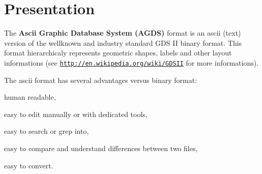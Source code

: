 \hypertarget{agds_agdsPres}{}\section{Presentation}\label{agds_agdsPres}
The {\bfseries Ascii Graphic Database System (A\-G\-D\-S)} format is an ascii (text) version of the wellknown and industry standard G\-D\-S I\-I binary format. This format hierarchicaly represents geometric shapes, labels and other layout informations (see \href{http://en.wikipedia.org/wiki/GDSII}{\tt http\-://en.\-wikipedia.\-org/wiki/\-G\-D\-S\-I\-I} for more informations). \par
The ascii format has several advantages versus binary format\-:
\begin{DoxyItemize}
\item human readable,
\item easy to edit manually or with dedicated tools,
\item easy to search or grep into,
\item easy to compare and understand differences between two files,
\item easy to convert.
\end{DoxyItemize}

